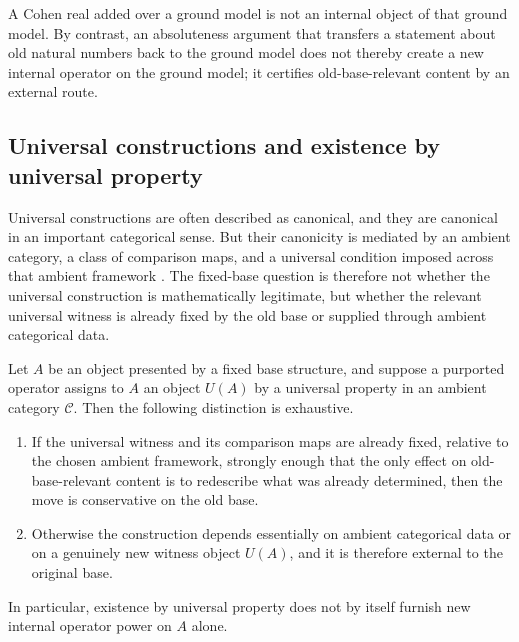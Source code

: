\begin{example}
A Cohen real added over a ground model is not an internal object of that ground model. By contrast, an absoluteness argument that transfers a statement about old natural numbers back to the ground model does not thereby create a new internal operator on the ground model; it certifies old-base-relevant content by an external route.
\end{example}

\subsection{Universal constructions and existence by universal property}

Universal constructions are often described as canonical, and they are canonical in an important categorical sense. But their canonicity is mediated by an ambient category, a class of comparison maps, and a universal condition imposed across that ambient framework \citep{MacLane1998}. The fixed-base question is therefore not whether the universal construction is mathematically legitimate, but whether the relevant universal witness is already fixed by the old base or supplied through ambient categorical data.

\begin{proposition}\label{prop:case-universal}
Let $A$ be an object presented by a fixed base structure, and suppose a purported operator assigns to $A$ an object $U(A)$ by a universal property in an ambient category $\mathcal{C}$. Then the following distinction is exhaustive.
\begin{enumerate}[label=(\alph*)]
    \item If the universal witness and its comparison maps are already fixed, relative to the chosen ambient framework, strongly enough that the only effect on old-base-relevant content is to redescribe what was already determined, then the move is conservative on the old base.
    \item Otherwise the construction depends essentially on ambient categorical data or on a genuinely new witness object $U(A)$, and it is therefore external to the original base.
\end{enumerate}
In particular, existence by universal property does not by itself furnish new internal operator power on $A$ alone.
\end{proposition}

